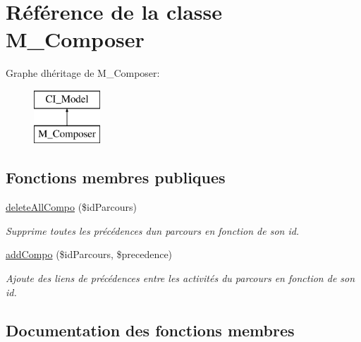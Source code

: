 \hypertarget{class_m___composer}{}\section{Référence de la classe M\+\_\+\+Composer}
\label{class_m___composer}
Graphe d\textquotesingle{}héritage de M\+\_\+\+Composer\+:\begin{figure}[H]
\begin{center}
\leavevmode
\includegraphics[height=2.000000cm]{class_m___composer}
\end{center}
\end{figure}
\subsection*{Fonctions membres publiques}
\begin{DoxyCompactItemize}
\item 
\hyperlink{class_m___composer_af322ea3745d7e49c2a8ee4228a7611a5}{delete\+All\+Compo} (\$id\+Parcours)
\begin{DoxyCompactList}\small\item\em Supprime toutes les précédences d\textquotesingle{}un parcours en fonction de son id. \end{DoxyCompactList}\item 
\hyperlink{class_m___composer_a53f149d52ce8a73ad3d85aabae383470}{add\+Compo} (\$id\+Parcours, \$precedence)
\begin{DoxyCompactList}\small\item\em Ajoute des liens de précédences entre les activités du parcours en fonction de son id. \end{DoxyCompactList}\end{DoxyCompactItemize}


\subsection{Documentation des fonctions membres}
\mbox{\label{class_m___composer_a53f149d52ce8a73ad3d85aabae383470}} 
